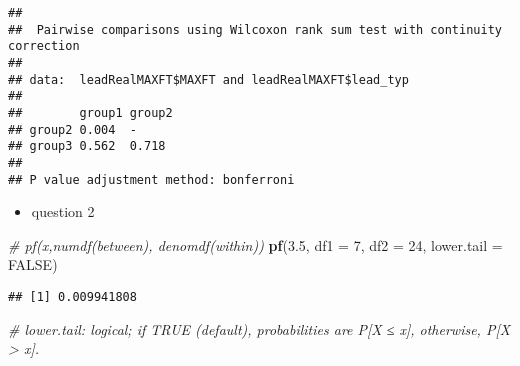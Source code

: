 \documentclass[
]{article}
\newenvironment{Shaded}{\begin{snugshade}}{\end{snugshade}}
\newcommand{\CommentTok}[1]{\textcolor[rgb]{0.56,0.35,0.01}{\textit{#1}}}
\newcommand{\DataTypeTok}[1]{\textcolor[rgb]{0.13,0.29,0.53}{#1}}
\newcommand{\DecValTok}[1]{\textcolor[rgb]{0.00,0.00,0.81}{#1}}
\newcommand{\FloatTok}[1]{\textcolor[rgb]{0.00,0.00,0.81}{#1}}
\newcommand{\KeywordTok}[1]{\textcolor[rgb]{0.13,0.29,0.53}{\textbf{#1}}}
\newcommand{\NormalTok}[1]{#1}
\newcommand{\OperatorTok}[1]{\textcolor[rgb]{0.81,0.36,0.00}{\textbf{#1}}}
\newcommand{\OtherTok}[1]{\textcolor[rgb]{0.56,0.35,0.01}{#1}}
\newcommand{\StringTok}[1]{\textcolor[rgb]{0.31,0.60,0.02}{#1}}
\providecommand{\tightlist}{%
  \setlength{\itemsep}{0pt}\setlength{\parskip}{0pt}}
\begin{document}
\begin{Shaded}
\end{Shaded}

\begin{verbatim}
## 
##  Pairwise comparisons using Wilcoxon rank sum test with continuity correction 
## 
## data:  leadRealMAXFT$MAXFT and leadRealMAXFT$lead_typ 
## 
##        group1 group2
## group2 0.004  -     
## group3 0.562  0.718 
## 
## P value adjustment method: bonferroni
\end{verbatim}

\begin{itemize}
\tightlist
\item
  question 2
\end{itemize}

\begin{Shaded}
\begin{Highlighting}[]
\CommentTok{# pf(x,numdf(between), denomdf(within))}
\KeywordTok{pf}\NormalTok{(}\FloatTok{3.5}\NormalTok{, }\DataTypeTok{df1 =} \DecValTok{7}\NormalTok{, }\DataTypeTok{df2 =} \DecValTok{24}\NormalTok{, }\DataTypeTok{lower.tail =} \OtherTok{FALSE}\NormalTok{)}
\end{Highlighting}
\end{Shaded}

\begin{verbatim}
## [1] 0.009941808
\end{verbatim}

\begin{Shaded}
\begin{Highlighting}[]
\CommentTok{# lower.tail: logical; if TRUE (default), probabilities are P[X ≤ x], otherwise, P[X > x].}
\end{Highlighting}
\end{Shaded}
\end{document}
